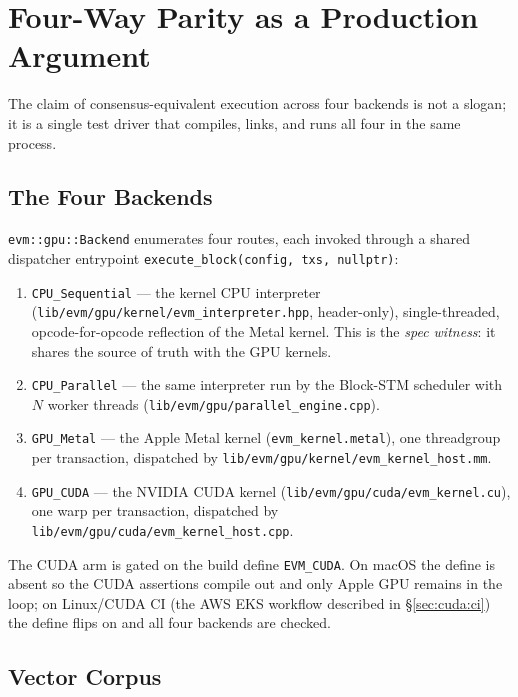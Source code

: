 \section{Four-Way Parity as a Production Argument}

\label{sec:parity}

The claim of consensus-equivalent execution across four backends is not a
slogan; it is a single test driver that compiles, links, and runs all four
in the same process.

\subsection{The Four Backends}

\texttt{evm::gpu::Backend} enumerates four routes, each invoked through a
shared dispatcher entrypoint
\texttt{execute\_block(config, txs, nullptr)}:

\begin{enumerate}
  \item \texttt{CPU\_Sequential} --- the kernel CPU interpreter
    (\texttt{lib/evm/gpu/kernel/evm\_interpreter.hpp}, header-only),
    single-threaded, opcode-for-opcode reflection of the Metal kernel.
    This is the \emph{spec witness}: it shares the source of truth with
    the GPU kernels.
  \item \texttt{CPU\_Parallel} --- the same interpreter run by the
    Block-STM scheduler with $N$ worker threads
    (\texttt{lib/evm/gpu/parallel\_engine.cpp}).
  \item \texttt{GPU\_Metal} --- the Apple Metal kernel
    (\texttt{evm\_kernel.metal}), one threadgroup per transaction, dispatched
    by \texttt{lib/evm/gpu/kernel/evm\_kernel\_host.mm}.
  \item \texttt{GPU\_CUDA} --- the NVIDIA CUDA kernel
    (\texttt{lib/evm/gpu/cuda/evm\_kernel.cu}), one warp per transaction,
    dispatched by \texttt{lib/evm/gpu/cuda/evm\_kernel\_host.cpp}.
\end{enumerate}

The CUDA arm is gated on the build define \texttt{EVM\_CUDA}. On macOS the
define is absent so the CUDA assertions compile out and only Apple GPU
remains in the loop; on Linux/CUDA CI (the AWS EKS workflow described in
\S\ref{sec:cuda:ci}) the define flips on and all four backends are
checked.

\subsection{Vector Corpus}


